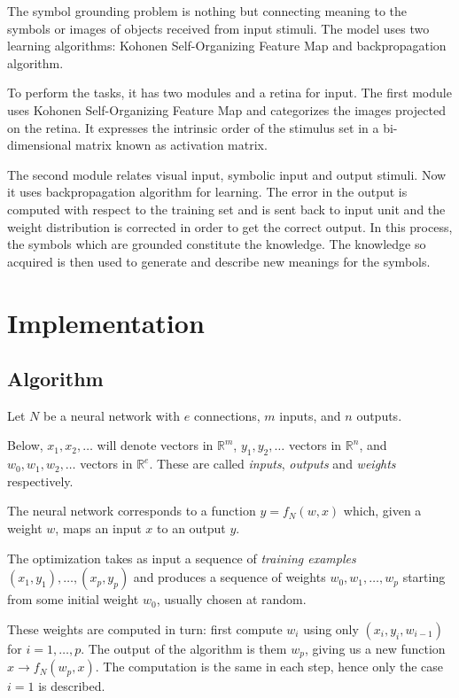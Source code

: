 \documentclass[a4paper]{article}
\begin{document}
The symbol grounding problem is nothing but connecting meaning to the symbols or images of objects received from input stimuli. The model uses two learning algorithms: Kohonen Self-Organizing Feature Map and backpropagation algorithm.

To perform the tasks, it has two modules and a retina for input. The first module uses Kohonen Self-Organizing Feature Map and categorizes the images projected on the retina. It expresses the intrinsic order of the stimulus set in a bi-dimensional matrix known as activation matrix.

The second module relates visual input, symbolic input and output stimuli. Now it uses backpropagation algorithm for learning. The error in the output is computed with respect to the training set and is sent back to input unit and the weight distribution is corrected in order to get the correct output. In this process, the symbols which are grounded constitute the knowledge. The knowledge so acquired is then used to generate and describe new meanings for the symbols.
\section{Implementation}
\subsection{Algorithm}
Let $N$ be a neural network with $e$ connections, $m$ inputs, and $n$ outputs.

Below,  $x_1, x_2, \ldots$ will denote vectors in $\mathbb{R}^m$, $y_1, y_2, \ldots$ vectors in $\mathbb{R}^n$, and $w_0, w_1, w_2, \ldots$ vectors in $\mathbb{R}^e$. These are called \textit{inputs}, \textit{outputs} and \textit{weights} respectively.

The neural network corresponds to a function $y = f_N (w,x)$  which, given a weight $w$, maps an input $x$ to an output $y$.

The optimization takes as input a sequence of \textit{training examples} $(x_1, y_1),\ldots,(x_p,y_p)$ and produces a sequence of weights $w_0, w_1, \ldots, w_p$ starting from some initial weight $w_0$, usually chosen at random.

These weights are computed in turn: first compute $w_i$ using only $(x_i, y_i, w_{i-1})$  for $i=1,\ldots,p$. The output of the algorithm is them $w_p$, giving us a new function $x\rightarrow f_N(w_p,x)$. The computation is the same in each step, hence only the case $i=1$ is described.
\end{document}
